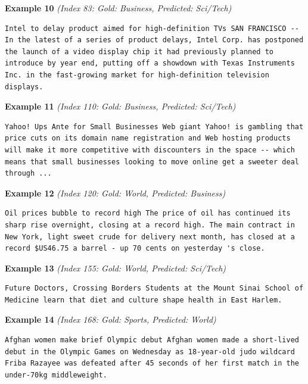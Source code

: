 \noindent
\textbf{Example 10} \quad \textit{(Index 83: Gold: Business, Predicted: Sci/Tech)}

\begin{Verbatim}[breaklines=true,breakanywhere=true,fontsize=\small]
Intel to delay product aimed for high-definition TVs SAN FRANCISCO -- In the latest of a series of product delays, Intel Corp. has postponed the launch of a video display chip it had previously planned to introduce by year end, putting off a showdown with Texas Instruments Inc. in the fast-growing market for high-definition television displays.
\end{Verbatim}

\noindent
\textbf{Example 11} \quad \textit{(Index 110: Gold: Business, Predicted: Sci/Tech)}

\begin{Verbatim}[breaklines=true,breakanywhere=true,fontsize=\small]
Yahoo! Ups Ante for Small Businesses Web giant Yahoo! is gambling that price cuts on its domain name registration and Web hosting products will make it more competitive with discounters in the space -- which means that small businesses looking to move online get a sweeter deal through ...
\end{Verbatim}

\noindent
\textbf{Example 12} \quad \textit{(Index 120: Gold: World, Predicted: Business)}

\begin{Verbatim}[breaklines=true,breakanywhere=true,fontsize=\small]
Oil prices bubble to record high The price of oil has continued its sharp rise overnight, closing at a record high. The main contract in New York, light sweet crude for delivery next month, has closed at a record $US46.75 a barrel - up 70 cents on yesterday 's close.
\end{Verbatim}

\noindent
\textbf{Example 13} \quad \textit{(Index 155: Gold: World, Predicted: Sci/Tech)}

\begin{Verbatim}[breaklines=true,breakanywhere=true,fontsize=\small]
Future Doctors, Crossing Borders Students at the Mount Sinai School of Medicine learn that diet and culture shape health in East Harlem.
\end{Verbatim}

\noindent
\textbf{Example 14} \quad \textit{(Index 168: Gold: Sports, Predicted: World)}

\begin{Verbatim}[breaklines=true,breakanywhere=true,fontsize=\small]
Afghan women make brief Olympic debut Afghan women made a short-lived debut in the Olympic Games on Wednesday as 18-year-old judo wildcard Friba Razayee was defeated after 45 seconds of her first match in the under-70kg middleweight.
\end{Verbatim}

